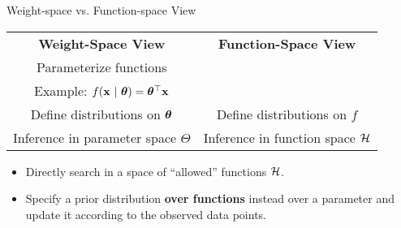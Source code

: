 \documentclass[11pt,compress,t,notes=noshow, xcolor=table]{beamer}
\begin{document}
\begin{frame}{Weight-space vs. Function-space View}

\begin{table}
  \begin{tabular}{cc}
  \textbf{Weight-Space View} & \textbf{Function-Space View} \vspace{1mm}\\ 
  Parameterize functions & \\
  \footnotesize Example: $f(\mathbf{x} ~|~ \bm{\theta}) = \bm{\theta}^\top \mathbf{x}$ & \vspace{1mm}\\
  Define distributions on $\bm{\theta}$ & Define distributions on $f$ \vspace{1mm}\\
  Inference in parameter space $\Theta$ & Inference in function space $\mathcal{H}$
  \end{tabular}
\end{table}  


\begin{itemize}
  \item Directly search in a space of \enquote{allowed} functions $\mathcal{H}$.  
  \item Specify a prior distribution \textbf{over functions} instead over a parameter and update it according to the observed data points. 
\end{itemize}


\begin{center}
    
\end{center}
\end{frame}
\end{document}
